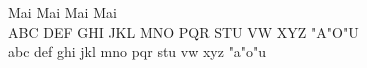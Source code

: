 %
\topmargin=-25mm         \textheight=140mm       %
\oddsidemargin=-10mm     \evensidemargin=-10mm
\textwidth=160mm         %

\setlength{\parskip}{1.5ex plus0.5ex minus 0.5ex} %
\parindent0mm

\pagestyle{empty}
\renewcommand{\arraystretch}{1.5} %

\Huge Mai \Large Mai \normalsize Mai \small Mai \normalsize
\\ \rm ABC DEF GHI JKL MNO PQR STU VW XYZ "A"O"U
\\ \rm abc def ghi jkl mno pqr stu vw xyz "a"o"u

